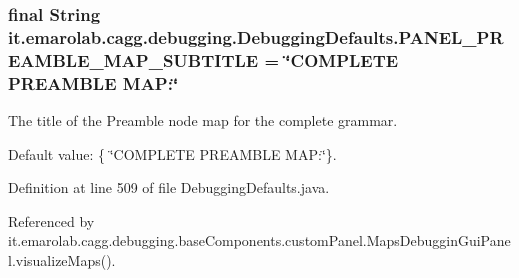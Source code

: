 \hypertarget{classit_1_1emarolab_1_1cagg_1_1debugging_1_1DebuggingDefaults_a34082b789d80232b8f3fc77e3e67c6ec}{
\subsubsection[{P\-A\-N\-E\-L\-\_\-\-P\-R\-E\-A\-M\-B\-L\-E\-\_\-\-M\-A\-P\-\_\-\-S\-U\-B\-T\-I\-T\-L\-E}]{\setlength{\rightskip}{0pt plus 5cm}final String it.\-emarolab.\-cagg.\-debugging.\-Debugging\-Defaults.\-P\-A\-N\-E\-L\-\_\-\-P\-R\-E\-A\-M\-B\-L\-E\-\_\-\-M\-A\-P\-\_\-\-S\-U\-B\-T\-I\-T\-L\-E = \char`\"{}C\-O\-M\-P\-L\-E\-T\-E P\-R\-E\-A\-M\-B\-L\-E M\-A\-P\-:\char`\"{}\hspace{0.3cm}{\ttfamily [static]}}}\label{classit_1_1emarolab_1_1cagg_1_1debugging_1_1DebuggingDefaults_a34082b789d80232b8f3fc77e3e67c6ec}
The title of the Preamble node map for the complete grammar.\par
 Default value\-: \{ \char`\"{}\-C\-O\-M\-P\-L\-E\-T\-E P\-R\-E\-A\-M\-B\-L\-E M\-A\-P\-:\char`\"{}\}. 

Definition at line 509 of file Debugging\-Defaults.\-java.



Referenced by it.\-emarolab.\-cagg.\-debugging.\-base\-Components.\-custom\-Panel.\-Maps\-Debuggin\-Gui\-Panel.\-visualize\-Maps().

